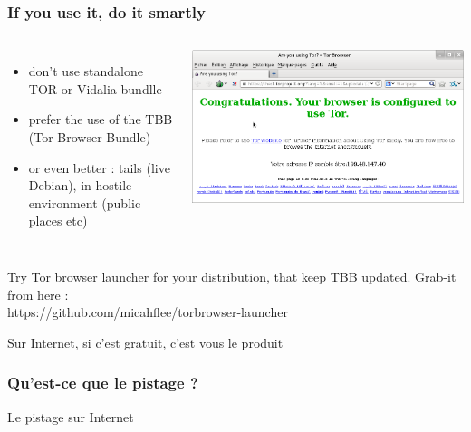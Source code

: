 \begin{frame}
\frametitle{If you use it, do it smartly}
\begin{columns}[c]
\begin{itemize}
\item don't use standalone TOR or Vidalia bundlle
\item prefer the use of the TBB (Tor Browser Bundle)
\item or even better : tails (live Debian), in hostile environment
(public places etc)
\end{itemize}
\includegraphics[keepaspectratio,width=\textwidth, height=.8\textheight]{./materials/tbb}
\end{columns}
Try Tor browser launcher for your distribution, that keep TBB updated. Grab-it
from here :\\ https://github.com/micahflee/torbrowser-launcher
\end{frame}
\begin{frame}
\begin{center}
\Huge{Sur Internet, si c'est gratuit, c'est vous le produit }
\end{center}
\end{frame}


\begin{frame}
\frametitle{Qu'est-ce que le pistage ?}


\begin{block}{Le pistage sur Internet}
\begin{itemize}
\end{itemize}
\end{block}
\end{frame}


